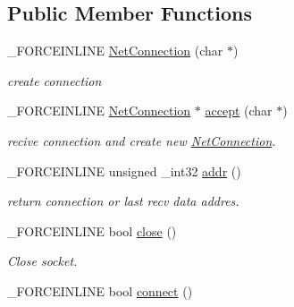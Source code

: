 \subsection*{Public Member Functions}
\begin{DoxyCompactItemize}
\item 
\hypertarget{classcsad_1_1_net_connection_a5072b9dd2d289ce7b3654f0988fa1d21}{\-\_\-\-F\-O\-R\-C\-E\-I\-N\-L\-I\-N\-E \hyperlink{classcsad_1_1_net_connection_a5072b9dd2d289ce7b3654f0988fa1d21}{Net\-Connection} (char $\ast$)}\label{classcsad_1_1_net_connection_a5072b9dd2d289ce7b3654f0988fa1d21}

\begin{DoxyCompactList}\small\item\em create connection \end{DoxyCompactList}\item 
\hypertarget{classcsad_1_1_net_connection_af5eb90166c8ba105b07159d6337a85e7}{\-\_\-\-F\-O\-R\-C\-E\-I\-N\-L\-I\-N\-E \hyperlink{classcsad_1_1_net_connection}{Net\-Connection} $\ast$ \hyperlink{classcsad_1_1_net_connection_af5eb90166c8ba105b07159d6337a85e7}{accept} (char $\ast$)}\label{classcsad_1_1_net_connection_af5eb90166c8ba105b07159d6337a85e7}

\begin{DoxyCompactList}\small\item\em recive connection and create new \hyperlink{classcsad_1_1_net_connection}{Net\-Connection}. \end{DoxyCompactList}\item 
\hypertarget{classcsad_1_1_net_connection_ab728f123450001d146cfd3599a0712d7}{\-\_\-\-F\-O\-R\-C\-E\-I\-N\-L\-I\-N\-E unsigned \-\_\-int32 \hyperlink{classcsad_1_1_net_connection_ab728f123450001d146cfd3599a0712d7}{addr} ()}\label{classcsad_1_1_net_connection_ab728f123450001d146cfd3599a0712d7}

\begin{DoxyCompactList}\small\item\em return connection or last recv data addres. \end{DoxyCompactList}\item 
\hypertarget{classcsad_1_1_net_connection_a6b9a1925025010ab14a739311174bb1f}{\-\_\-\-F\-O\-R\-C\-E\-I\-N\-L\-I\-N\-E bool \hyperlink{classcsad_1_1_net_connection_a6b9a1925025010ab14a739311174bb1f}{close} ()}\label{classcsad_1_1_net_connection_a6b9a1925025010ab14a739311174bb1f}

\begin{DoxyCompactList}\small\item\em Close socket. \end{DoxyCompactList}\item 
\hypertarget{classcsad_1_1_net_connection_ac1c3c64ca6d4811931a5fc430657d8f7}{\-\_\-\-F\-O\-R\-C\-E\-I\-N\-L\-I\-N\-E bool \hyperlink{classcsad_1_1_net_connection_ac1c3c64ca6d4811931a5fc430657d8f7}{connect} ()}\label{classcsad_1_1_net_connection_ac1c3c64ca6d4811931a5fc430657d8f7}


\end{DoxyCompactItemize}
